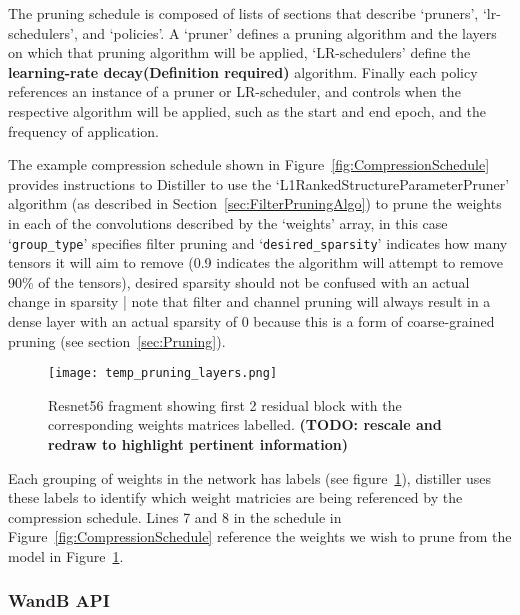 \documentclass[../Dissertation.tex]{subfiles}
\begin{document}
The pruning schedule is composed of lists of sections that describe `{\color{mintedgreen}pruners}', `{\color{mintedgreen}lr-schedulers}', and `{\color{mintedgreen}policies}'. 
A `{\color{mintedgreen}pruner}' defines a pruning algorithm and the layers on which that pruning algorithm will be applied, `LR-schedulers' define the \textbf{learning-rate decay(Definition required)} algorithm. 
Finally each policy references an instance of a pruner or LR-scheduler, and controls when the respective algorithm will be applied, such as the start and end epoch, and the frequency of application.

The example compression schedule shown in Figure~\ref{fig:CompressionSchedule} provides instructions to Distiller to use the `L1RankedStructureParameterPruner' algorithm (as described in Section~\ref{sec:FilterPruningAlgo}) to prune the weights in each of the convolutions described by the `weights' array, in this case `\texttt{\color{mintedgreen}group\_type}' specifies filter pruning and `\texttt{\color{mintedgreen}desired\_sparsity}' indicates how many tensors it will aim to remove (0.9 indicates the algorithm will attempt to remove 90\% of the tensors), desired sparsity should not be confused with an actual change in sparsity | note that filter and channel pruning will always result in a dense layer with an actual sparsity of 0 because this is a form of coarse-grained pruning (see section~\ref{sec:Pruning}).

\begin{figure}[H]
    \texttt{[image: temp\_pruning\_layers.png]}
    \caption{Resnet56 fragment showing first 2 residual block with the corresponding weights matrices labelled. \textbf{(TODO: rescale and redraw to highlight pertinent information)}}
    \label{fig:resnet56weightlabels}
\end{figure}

Each grouping of weights in the network has labels (see figure~\ref{fig:resnet56weightlabels}), distiller uses these labels to identify which weight matricies are being referenced by the compression schedule. 
Lines 7 and 8 in the schedule in Figure~\ref{fig:CompressionSchedule} reference the weights we wish to prune from the model in Figure~\ref{fig:resnet56weightlabels}.


\newpage
\subsubsection{WandB API}
\end{document}
